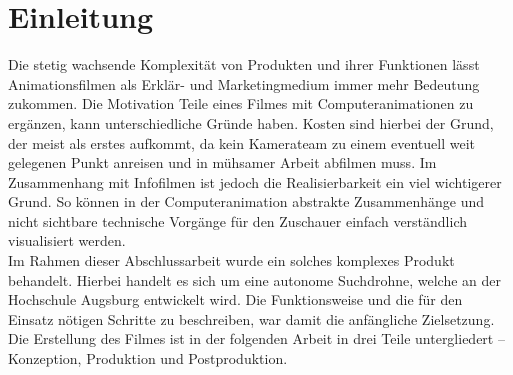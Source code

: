 
\chapter{Einleitung}

Die stetig wachsende Komplexität von Produkten und ihrer Funktionen lässt Animationsfilmen als Erklär- und Marketingmedium immer mehr Bedeutung zukommen. Die Motivation Teile eines Filmes mit Computeranimationen zu ergänzen, kann unterschiedliche Gründe haben. Kosten sind hierbei der Grund, der meist als erstes aufkommt, da kein Kamerateam zu einem eventuell weit gelegenen Punkt anreisen und in mühsamer Arbeit abfilmen muss. Im Zusammenhang mit Infofilmen ist jedoch die Realisierbarkeit ein viel wichtigerer Grund. So können in der Computeranimation abstrakte Zusammenhänge und nicht sichtbare technische Vorgänge für den Zuschauer einfach verständlich visualisiert werden.\\
Im Rahmen dieser Abschlussarbeit wurde ein solches komplexes Produkt behandelt. Hierbei handelt es sich um eine autonome Suchdrohne, welche an der Hochschule Augsburg entwickelt wird. Die Funktionsweise und die für den Einsatz nötigen Schritte zu beschreiben, war damit die anfängliche Zielsetzung.
Die Erstellung des Filmes ist in der folgenden Arbeit in drei Teile untergliedert -- Konzeption, Produktion und Postproduktion.